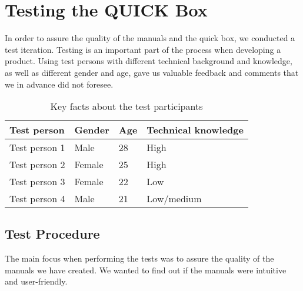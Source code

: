 \chapter{Testing the QUICK Box}
\label{chp:test} 

In order to assure the quality of the manuals and the \gls{quick} box, we conducted a test iteration. Testing is an important part of the process when developing a product. Using test persons with different technical background and knowledge, as well as different gender and age, gave us valuable feedback and comments that we in advance did not foresee. 

\begin{center}
\begin{table}[h!]
\caption{\label{tab:testpersons}Key facts about the test participants}
    \begin{tabular}{ | l | l | l | l |}
    \hline
    \textbf{Test person} & \textbf{Gender} & \textbf{Age} & \textbf{Technical knowledge} \\ 
    \hline
    Test person 1 &  Male & 28 & High\\ 
    \hline
    Test person 2 &  Female & 25 & High\\  
    \hline
    Test person 3 &  Female & 22 & Low\\  
    \hline
    Test person 4 &  Male & 21 & Low/medium\\  
    \hline
    \end{tabular}
   \end{table}
\end{center}


\section{Test Procedure}
The main focus when performing the tests was to assure the quality of the manuals we have created. We wanted to find out if the manuals were intuitive and user-friendly.

